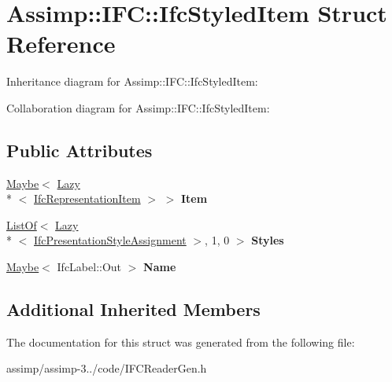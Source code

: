 \hypertarget{struct_assimp_1_1_i_f_c_1_1_ifc_styled_item}{\section{Assimp\+:\+:I\+F\+C\+:\+:Ifc\+Styled\+Item Struct Reference}
\label{struct_assimp_1_1_i_f_c_1_1_ifc_styled_item}
}


Inheritance diagram for Assimp\+:\+:I\+F\+C\+:\+:Ifc\+Styled\+Item\+:


Collaboration diagram for Assimp\+:\+:I\+F\+C\+:\+:Ifc\+Styled\+Item\+:
\subsection*{Public Attributes}
\begin{DoxyCompactItemize}
\item 
\hypertarget{struct_assimp_1_1_i_f_c_1_1_ifc_styled_item_a0150722b9864b94770bf42400ca5d6a9}{\hyperlink{struct_assimp_1_1_s_t_e_p_1_1_maybe}{Maybe}$<$ \hyperlink{struct_assimp_1_1_s_t_e_p_1_1_lazy}{Lazy}\\*
$<$ \hyperlink{struct_assimp_1_1_i_f_c_1_1_ifc_representation_item}{Ifc\+Representation\+Item} $>$ $>$ {\bfseries Item}}\label{struct_assimp_1_1_i_f_c_1_1_ifc_styled_item_a0150722b9864b94770bf42400ca5d6a9}

\item 
\hypertarget{struct_assimp_1_1_i_f_c_1_1_ifc_styled_item_ae100ac777dc17ee038faa00efbc6a394}{\hyperlink{struct_assimp_1_1_s_t_e_p_1_1_list_of}{List\+Of}$<$ \hyperlink{struct_assimp_1_1_s_t_e_p_1_1_lazy}{Lazy}\\*
$<$ \hyperlink{struct_assimp_1_1_i_f_c_1_1_ifc_presentation_style_assignment}{Ifc\+Presentation\+Style\+Assignment} $>$, 1, 0 $>$ {\bfseries Styles}}\label{struct_assimp_1_1_i_f_c_1_1_ifc_styled_item_ae100ac777dc17ee038faa00efbc6a394}

\item 
\hypertarget{struct_assimp_1_1_i_f_c_1_1_ifc_styled_item_a6bc8432448cdc6eaa024c8f36a36cf06}{\hyperlink{struct_assimp_1_1_s_t_e_p_1_1_maybe}{Maybe}$<$ Ifc\+Label\+::\+Out $>$ {\bfseries Name}}\label{struct_assimp_1_1_i_f_c_1_1_ifc_styled_item_a6bc8432448cdc6eaa024c8f36a36cf06}

\end{DoxyCompactItemize}
\subsection*{Additional Inherited Members}


The documentation for this struct was generated from the following file\+:\begin{DoxyCompactItemize}
\item 
assimp/assimp-\/3../code/I\+F\+C\+Reader\+Gen.\+h\end{DoxyCompactItemize}

